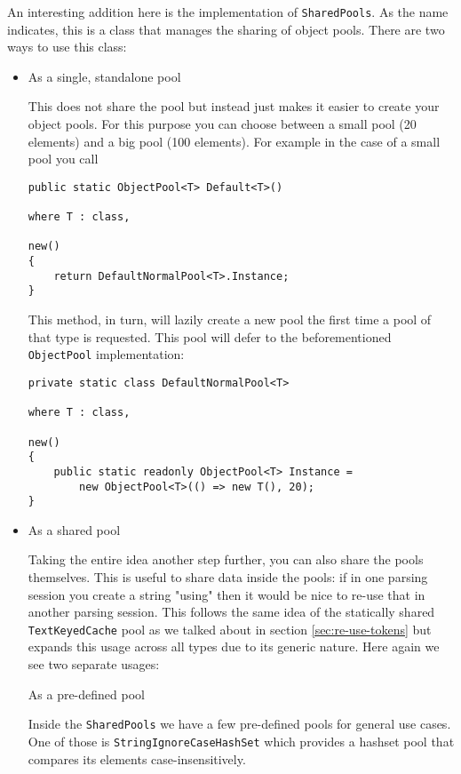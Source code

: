 An interesting addition here is the implementation of \verb|SharedPools|. As the name indicates, this is a class that manages the sharing of object pools. There are two ways to use this class:

\begin{itemize}
\item As a single, standalone pool

This does not share the pool but instead just makes it easier to create your object pools. For this purpose you can choose between a small pool (20 elements) and a big pool (100 elements). For example in the case of a small pool you call

\begin{lstlisting}
public static ObjectPool<T> Default<T>() 
																where T : class, 
																					new()
{
	return DefaultNormalPool<T>.Instance;
}
\end{lstlisting}

This method, in turn, will lazily create a new pool the first time a pool of that type is requested. This pool will defer to the beforementioned \verb|ObjectPool| implementation:

\begin{lstlisting}
private static class DefaultNormalPool<T> 
																where T : class, 
																					new()
{
	public static readonly ObjectPool<T> Instance = 
		new ObjectPool<T>(() => new T(), 20);
}
\end{lstlisting}

\item As a shared pool

Taking the entire idea another step further, you can also share the pools themselves. This is useful to share data inside the pools: if in one parsing session you create a string "using" then it would be nice to re-use that in another parsing session. This follows the same idea of the statically shared \verb|TextKeyedCache| pool as we talked about in section \ref{sec:re-use-tokens} but expands this usage across all types due to its generic nature. Here again we see two separate usages:

\subitem As a pre-defined pool

Inside the \verb|SharedPools| we have a few pre-defined pools for general use cases. One of those is \verb|StringIgnoreCaseHashSet| which provides a hashset pool that compares its elements case-insensitively.


\end{itemize}
